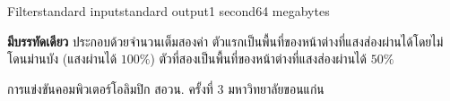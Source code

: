 \documentclass[11pt,a4paper]{article}
\begin{document}
\begin{problem}{Filter}{standard input}{standard output}{1 second}{64 megabytes}
\OutputFile

\textbf{มีบรรทัดเดียว} ประกอบด้วยจำนวนเต็มสองค่า ตัวแรกเป็นพื้นที่ของหน้าต่างที่แสงส่องผ่านได้โดยไม่โดนม่านบัง (แสงผ่านได้ $100\%$) ตัวที่สองเป็นพื้นที่ของหน้าต่างที่แสงส่องผ่านได้ $50\%$

\Examples

\begin{example}
%
\end{example}


\Source

การแข่งขันคอมพิวเตอร์โอลิมปิก สอวน. ครั้งที่ 3 มหาวิทยาลัยขอนแก่น

\end{problem}
\end{document}
